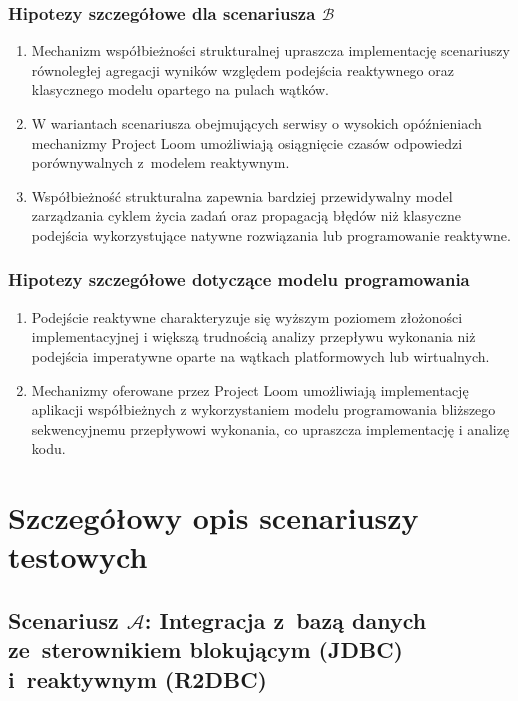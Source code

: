 \subsubsection{Hipotezy szczegółowe dla scenariusza \ensuremath{\mathcal{B}}}
\begin{enumerate}[label=\textbf{H\arabic*.}, start=5]
    \item Mechanizm współbieżności strukturalnej upraszcza implementację scenariuszy równoległej agregacji wyników względem podejścia reaktywnego oraz klasycznego modelu opartego na pulach wątków.

    \item W wariantach scenariusza obejmujących serwisy o wysokich opóźnieniach mechanizmy Project Loom umożliwiają osiągnięcie czasów odpowiedzi porównywalnych z~modelem reaktywnym.

    \item Współbieżność strukturalna zapewnia bardziej przewidywalny model zarządzania cyklem życia zadań oraz propagacją błędów niż klasyczne podejścia wykorzystujące natywne rozwiązania lub programowanie reaktywne.
\end{enumerate}

\subsubsection{Hipotezy szczegółowe dotyczące modelu programowania}
\begin{enumerate}[label=\textbf{H\arabic*.}, start=8]
    \item Podejście reaktywne charakteryzuje się wyższym poziomem złożoności implementacyjnej i większą trudnością analizy przepływu wykonania niż podejścia imperatywne oparte na wątkach platformowych lub wirtualnych.

    \item Mechanizmy oferowane przez Project Loom umożliwiają implementację aplikacji współbieżnych z wykorzystaniem modelu programowania bliższego sekwencyjnemu przepływowi wykonania, co upraszcza implementację i analizę kodu.
\end{enumerate}

\section{Szczegółowy opis scenariuszy testowych}

\subsection{Scenariusz \ensuremath{\mathcal{A}}: Integracja z~bazą danych ze~sterownikiem blokującym (JDBC) i~reaktywnym (R2DBC)}
\label{sec:description-scenario-A}

